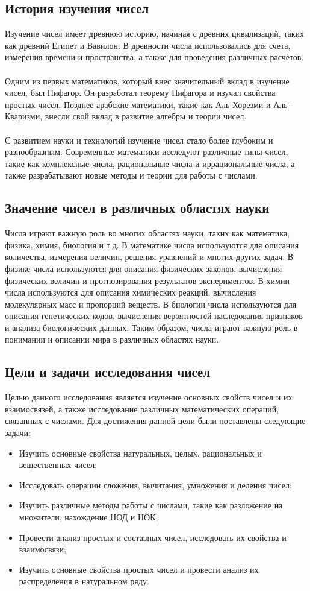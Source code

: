 \documentclass{article}
\begin{document}
\subsection{История изучения чисел}
Изучение чисел имеет древнюю историю, начиная с древних цивилизаций, таких как древний Египет и Вавилон. В древности числа использовались для счета, измерения времени и пространства, а также для проведения различных расчетов.\\
~\\
Одним из первых математиков, который внес значительный вклад в изучение чисел, был Пифагор. Он разработал теорему Пифагора и изучал свойства простых чисел. Позднее арабские математики, такие как Аль-Хорезми и Аль-Кваризми, внесли свой вклад в развитие алгебры и теории чисел.\\
~\\
С развитием науки и технологий изучение чисел стало более глубоким и разнообразным. Современные математики исследуют различные типы чисел, такие как комплексные числа, рациональные числа и иррациональные числа, а также разрабатывают новые методы и теории для работы с числами.
\subsection{Значение чисел в различных областях науки}
Числа играют важную роль во многих областях науки, таких как математика, физика, химия, биология и т.д. В математике числа используются для описания количества, измерения величин, решения уравнений и многих других задач. В физике числа используются для описания физических законов, вычисления физических величин и прогнозирования результатов экспериментов. В химии числа используются для описания химических реакций, вычисления молекулярных масс и пропорций веществ. В биологии числа используются для описания генетических кодов, вычисления вероятностей наследования признаков и анализа биологических данных. Таким образом, числа играют важную роль в понимании и описании мира в различных областях науки.
\subsection{Цели и задачи исследования чисел}
Целью данного исследования является изучение основных свойств чисел и их взаимосвязей, а также исследование различных математических операций, связанных с числами. Для достижения данной цели были поставлены следующие задачи:
\begin{itemize}
\item Изучить основные свойства натуральных, целых, рациональных и вещественных чисел;
\item Исследовать операции сложения, вычитания, умножения и деления чисел;
\item Изучить различные методы работы с числами, такие как разложение на множители, нахождение НОД и НОК;
\item Провести анализ простых и составных чисел, исследовать их свойства и взаимосвязи;
\item Изучить основные свойства простых чисел и провести анализ их распределения в натуральном ряду.
\end{itemize}
\end{document}
